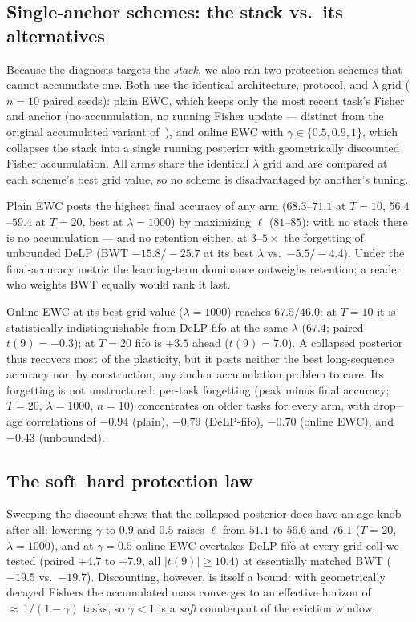 \documentclass[review,12pt,number]{elsarticle}
\newcommand{\delp}{DeLP}
\begin{document}
\subsection{Single-anchor schemes: the stack vs.\ its alternatives}
\label{sec:exp-references}

Because the diagnosis targets the \emph{stack}, we also ran two
protection schemes that cannot accumulate one. Both use the identical
architecture, protocol, and $\lambda$ grid ($n{=}10$ paired seeds):
plain EWC, which keeps only the most recent task's Fisher and anchor
(no accumulation, no running Fisher update --- distinct from the
original accumulated variant of~\cite{kirkpatrick2017}), and online
EWC \cite{chaudhry2018} with $\gamma \in \{0.5, 0.9, 1\}$, which
collapses the stack into a single running posterior with geometrically
discounted Fisher accumulation. All arms share the identical
$\lambda$ grid and are compared at each scheme's best grid value, so
no scheme is disadvantaged by another's tuning.

Plain EWC posts the highest final accuracy
of any arm ($68.3$--$71.1$ at $T{=}10$, $56.4$--$59.4$ at $T{=}20$,
best at $\lambda{=}1000$) by maximizing $\ell$ ($81$--$85$): with no
stack there is no accumulation --- and no retention either, at
$3$--$5\times$ the forgetting of unbounded \delp{} (BWT
$-15.8/-25.7$ at its best $\lambda$ vs.\ $-5.5/-4.4$). Under the
final-accuracy metric the learning-term dominance outweighs retention;
a reader who weights BWT equally would rank it last.

Online EWC at its best grid value ($\lambda{=}1000$) reaches $67.5/46.0$:
at $T{=}10$ it is statistically indistinguishable from \delp{}-fifo at
the same $\lambda$ ($67.4$; paired $t(9){=}-0.3$); at $T{=}20$ fifo is
$+3.5$ ahead ($t(9){=}7.0$). A collapsed posterior thus recovers most of
the plasticity, but it posts neither the best long-sequence accuracy
nor, by construction, any anchor accumulation problem to cure. Its
forgetting is not unstructured: per-task forgetting (peak minus final
accuracy; $T{=}20$, $\lambda{=}1000$, $n{=}10$) concentrates on older
tasks for every arm, with drop--age correlations of $-0.94$ (plain),
$-0.79$ (\delp{}-fifo), $-0.70$ (online EWC), and $-0.43$ (unbounded).

\subsection{The soft--hard protection law}
\label{sec:exp-law}

Sweeping the discount shows that the collapsed posterior does have an
age knob after all: lowering $\gamma$ to $0.9$ and $0.5$
raises $\ell$ from $51.1$ to $56.6$ and $76.1$ ($T{=}20$,
$\lambda{=}1000$), and at $\gamma{=}0.5$ online EWC overtakes
\delp{}-fifo at every grid cell we tested (paired $+4.7$ to $+7.9$,
all $|t(9)|\geq10.4$) at essentially matched BWT ($-19.5$ vs.\
$-19.7$). Discounting, however, is itself a bound: with geometrically
decayed Fishers the accumulated mass converges to an effective horizon
of ${\approx}\,1/(1-\gamma)$ tasks, so $\gamma{<}1$ is a \emph{soft}
counterpart of the eviction window.
\end{document}
